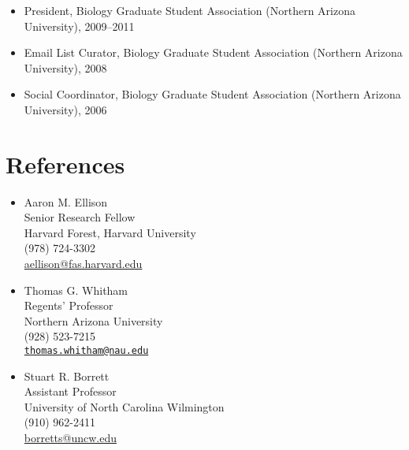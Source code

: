 \documentclass[a4paper]{article}
\begin{document}
\begin{itemize}
\item
  President, Biology Graduate Student Association (Northern Arizona
  University), 2009--2011
\item
  Email List Curator, Biology Graduate Student Association (Northern
  Arizona University), 2008
\item
  Social Coordinator, Biology Graduate Student Association (Northern
  Arizona University), 2006
\end{itemize}

\section{References}\label{references}

\begin{multicols}{2}

\begin{itemize}
\item
  Aaron M. Ellison\\ Senior Research Fellow\\ Harvard Forest, Harvard
  University\\(978)
  724-3302\\\href{mailto:aellison@fas.harvard.edu}{aellison@fas.harvard.edu}
\item
  Thomas G. Whitham\\ Regents' Professor\\ Northern Arizona
  University\\(928)
  523-7215\\\href{mailto:thomas.whitham@nau.edu}{\texttt{thomas.whitham@nau.edu}}
\item
  Stuart R. Borrett\\ Assistant Professor\\ University of North Carolina
  Wilmington\\(910)
  962-2411\\\href{mailto:borretts@uncw.edu}{borretts@uncw.edu}
\end{itemize}


\end{multicols}
\end{document}
